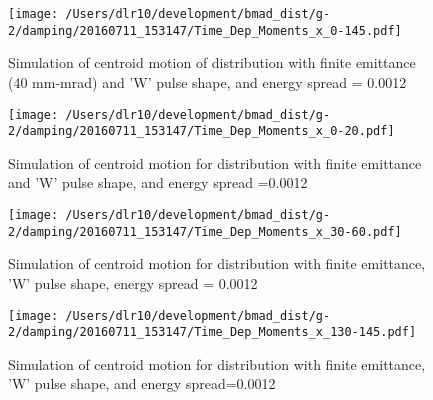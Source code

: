 \documentclass[10pt]{article}
\begin{document}
\begin{figure}[htbp] %
\begin{minipage}[t]{0.48\textwidth}
   \centering
   \texttt{[image: /Users/dlr10/development/bmad\_dist/g-2/damping/20160711\_153147/Time\_Dep\_Moments\_x\_0-145.pdf]} 
   \caption{Simulation of centroid motion of distribution with finite emittance (40 mm-mrad) and 'W' pulse shape,
and energy spread = 0.0012\label{fig:20160711_153147-finite-emit-tau-energy_0-145}}
 \end{minipage}
\hfill
\begin{minipage}[t]{0.48\textwidth}
   \centering
   \texttt{[image: /Users/dlr10/development/bmad\_dist/g-2/damping/20160711\_153147/Time\_Dep\_Moments\_x\_0-20.pdf]} 
   \caption{Simulation of centroid motion for distribution with finite emittance and 'W' pulse shape, and energy spread =0.0012\label{fig:20160711_153147-finite-emit-tau-energy_0-20}}
 \end{minipage}
\end{figure}
\begin{figure}[htbp] %
\begin{minipage}[t]{0.48\textwidth}
   \centering
   \texttt{[image: /Users/dlr10/development/bmad\_dist/g-2/damping/20160711\_153147/Time\_Dep\_Moments\_x\_30-60.pdf]} 
   \caption{Simulation of centroid motion for distribution with finite emittance, 'W' pulse shape, energy spread = 0.0012\label{fig:20160711_153147-finite-emit-tau-energy_0-145}}
 \end{minipage}
\hfill
\begin{minipage}[t]{0.48\textwidth}
   \centering
   \texttt{[image: /Users/dlr10/development/bmad\_dist/g-2/damping/20160711\_153147/Time\_Dep\_Moments\_x\_130-145.pdf]} 
   \caption{Simulation of centroid motion for distribution with finite emittance, 'W' pulse shape, and energy spread=0.0012\label{fig:20160711_153147-finite-emit-tau-energy_130-145}}
 \end{minipage}
\end{figure}
\end{document}
